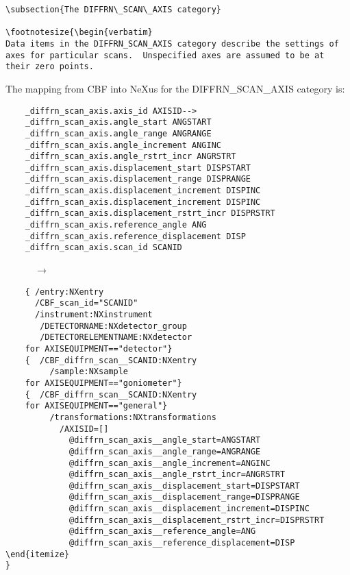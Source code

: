 \documentclass[11pt]{article}
\begin{document}
{{{\begin{verbatim}
\subsection{The DIFFRN\_SCAN\_AXIS category}

\footnotesize{\begin{verbatim}
Data items in the DIFFRN_SCAN_AXIS category describe the settings of
axes for particular scans.  Unspecified axes are assumed to be at
their zero points.
\end{verbatim}

The mapping from CBF into NeXus for the DIFFRN\_SCAN\_AXIS category is:

\begin{verbatim}     
    _diffrn_scan_axis.axis_id AXISID-->
    _diffrn_scan_axis.angle_start ANGSTART
    _diffrn_scan_axis.angle_range ANGRANGE 
    _diffrn_scan_axis.angle_increment ANGINC 
    _diffrn_scan_axis.angle_rstrt_incr ANGRSTRT 
    _diffrn_scan_axis.displacement_start DISPSTART 
    _diffrn_scan_axis.displacement_range DISPRANGE 
    _diffrn_scan_axis.displacement_increment DISPINC 
    _diffrn_scan_axis.displacement_increment DISPINC 
    _diffrn_scan_axis.displacement_rstrt_incr DISPRSTRT 
    _diffrn_scan_axis.reference_angle ANG 
    _diffrn_scan_axis.reference_displacement DISP 
    _diffrn_scan_axis.scan_id SCANID
\end{verbatim}
~~~~~~{\bf{}$\rightarrow$}\\
\begin{verbatim}
    { /entry:NXentry
      /CBF_scan_id="SCANID"
      /instrument:NXinstrument
       /DETECTORNAME:NXdetector_group
       /DETECTORELEMENTNAME:NXdetector
    for AXISEQUIPMENT=="detector"}
    {  /CBF_diffrn_scan__SCANID:NXentry
         /sample:NXsample
    for AXISEQUIPMENT=="goniometer"}
    {  /CBF_diffrn_scan__SCANID:NXentry
    for AXISEQUIPMENT=="general"}
         /transformations:NXtransformations
           /AXISID=[]
             @diffrn_scan_axis__angle_start=ANGSTART
             @diffrn_scan_axis__angle_range=ANGRANGE
             @diffrn_scan_axis__angle_increment=ANGINC
             @diffrn_scan_axis__angle_rstrt_incr=ANGRSTRT
             @diffrn_scan_axis__displacement_start=DISPSTART
             @diffrn_scan_axis__displacement_range=DISPRANGE
             @diffrn_scan_axis__displacement_increment=DISPINC
             @diffrn_scan_axis__displacement_rstrt_incr=DISPRSTRT
             @diffrn_scan_axis__reference_angle=ANG
             @diffrn_scan_axis__reference_displacement=DISP
\end{itemize}
}

\end{verbatim}}}}
\end{document}
